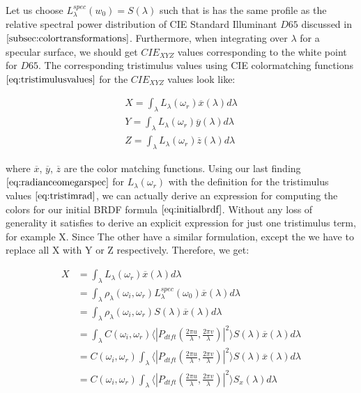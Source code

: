 Let us choose $L_\lambda^{spec}(w_0) = S(\lambda)$ such that is has the same profile as the relative spectral power distribution of CIE Standard Illuminant $D65$ discussed in $\ref{subsec:colortransformations}$. Furthermore, when integrating over $\lambda$ for a specular surface, we should get $CIE_{XYZ}$ values corresponding to the white point for $D65$. The corresponding tristimulus values using CIE colormatching functions $\ref{eq:tristimulusvalues}$ for the $CIE_{XYZ}$ values look like:

\begin{align}
X = \int_{\lambda}L_\lambda(\omega_r)\overline{x}(\lambda)d\lambda \nonumber \\
Y = \int_{\lambda}L_\lambda(\omega_r)\overline{y}(\lambda)d\lambda \nonumber \\
Z = \int_{\lambda}L_\lambda(\omega_r)\overline{z}(\lambda)d\lambda
\label{eq:tristimrad}
\end{align}

where $\overline{x}$, $\overline{y}$, $\overline{z}$ are the color matching functions. Using our last finding $\ref{eq:radianceomegarspec}$ for $L_\lambda(\omega_r)$ with the definition for the tristimulus values $\ref{eq:tristimrad}$, we can actually derive an expression for computing the colors for our initial BRDF formula $\ref{eq:initialbrdf}$. 
Without any loss of generality it satisfies to derive an explicit expression for just one tristimulus term, for example X. Since The other have a similar formulation, except the we have to replace all X with Y or Z respectively. Therefore, we get:

\begin{align}
X 
& =\int_{\lambda}L_\lambda(\omega_r)\overline{x}(\lambda)d\lambda \nonumber \\
& =\int_{\lambda}\rho_\lambda(\omega_i,\omega_r)L_\lambda^{spec}(\omega_0) \overline{x}(\lambda)d\lambda \nonumber \\
& =\int_{\lambda}\rho_\lambda(\omega_i,\omega_r) S(\lambda) \overline{x}(\lambda)d\lambda \nonumber \\
& =\int_{\lambda} C(\omega_i,\omega_r) \langle \left|P_{dtft}(\frac{2\pi u}{\lambda}, \frac{2\pi v}{\lambda})\right|^2\rangle S(\lambda) \overline{x}(\lambda)d\lambda \nonumber \\
& = C(\omega_i,\omega_r) \int_{\lambda} \langle \left|P_{dtft}(\frac{2\pi u}{\lambda}, \frac{2\pi v}{\lambda})\right|^2\rangle S(\lambda) \overline{x}(\lambda)d\lambda \nonumber \\
& = C(\omega_i,\omega_r) \int_{\lambda} \langle \left|P_{dtft}(\frac{2\pi u}{\lambda}, \frac{2\pi v}{\lambda})\right|^2\rangle S_x(\lambda)d\lambda
\end{align}

